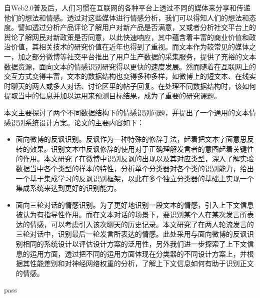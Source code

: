 \begin{cabstract}

自Web2.0普及后，人们习惯在互联网的各种平台上透过不同的媒体来分享和传递他们的想法和情感。透过对这些媒体进行情感分析，我们可以得知人们的想法和态度。譬如透过分析产品评论了解用户对新产品是否满意，又或者分析社交平台上的舆论了解网民对新政策是否同意，以此快速响应，其中蕴含着丰富的商业价值和政治价值，其相关技术的研究价值在近年也得到了重视。而文本作为较常见的媒体之一，加之部分微博等社交平台推出了用户生产数据的采集服务，提供了充裕的文本数据资源，面向文本的情感识别研究得以更快的速度发展。然而随着在互联网上的交互方式变得丰富，文本的数据结构也变得多种多样，如微博上的短文本、在线实时聊天的两人或多人对话、讨论区里的帖子回复。在处理不同数据结构时，该如何提取当中的信息并加以运用来预测目标结果，成为了重要的研究课题。

本文主要探讨了两个不同数据结构下的情感识别问题，并提出了一个通用的文本情感识别系统设计方案。论文的主要内容如下：

\begin{itemize}

\item 面向微博的反讽识别。反讽作为一种特殊的修辞手法，起着把文本字面意思反转的效果。识别文本中反讽修辞的使用对于正确理解发言者的意图起着关键性的作用。本文研究了在微博中识别反讽的出现以及其对应类型，深入了解实验数据当中各个类型的样本的特性，分析单个分类器对各个类的识别能力，给出一个基于集成学习的反讽识别框架，以此在多个独立分类器的基础上实现一个集成系统来达到更好的识别能力。

\item 面向三轮对话的情感识别。为了更好地识别一段文本的情感，引入上下文信息被认为有指导性作用。而在文本对话的场景下，要识别某个人在某次发言所表达的情感，可以考虑引入该次聊天的历史记录。本文研究了在两人轮流发言的三轮对话中，识别最后一轮发言所表达的情感。此处采用与面向微博的反讽识别相同的系统设计以评估设计方案的泛用性，另外我们进一步探索了上下文信息的运用方面，透过把不同的运用方面体现在分类器的不同设计方案上，并根据其性能差别和对神经网络权重的分析，了解上下文信息如何有助于识别正文的情感。
\end{itemize}


\end{cabstract}


\begin{eabstract}
   
   pass

\end{eabstract}

